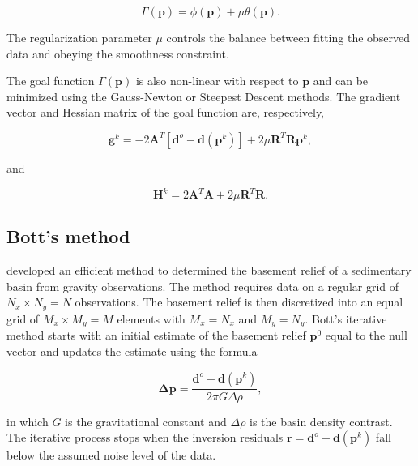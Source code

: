 \documentclass[extra,mreferee]{gji}
\begin{document}
\begin{equation}
    \Gamma(\mathbf{p}) = \phi(\mathbf{p}) + \mu\theta(\mathbf{p}).
\end{equation}

\noindent
The regularization parameter $\mu$ controls the balance between fitting the
observed data and obeying the smoothness constraint.

The goal function $\Gamma(\mathbf{p})$ is also non-linear with respect to
$\mathbf{p}$ and can be minimized using the Gauss-Newton or Steepest Descent
methods.
The gradient vector and Hessian matrix of the goal function are, respectively,

\begin{equation}
    \mathbf{g}^k =
        -2\mathbf{A}^T[\mathbf{d}^o - \mathbf{d}(\mathbf{p}^k)] +
        2\mu\mathbf{R}^T\mathbf{R}\mathbf{p}^k,
    \label{eq:gradient-regul}
\end{equation}

\noindent and

\begin{equation}
    \mathbf{H}^k = 2\mathbf{A}^T\mathbf{A} + 2\mu\mathbf{R}^T\mathbf{R}.
    \label{eq:hessian-regul}
\end{equation}



\subsection{Bott's method}

\citet{bott_use_1960} developed an efficient method to determined the basement
relief of a sedimentary basin from gravity observations.
The method requires data on a regular grid of $N_x \times N_y = N$
observations.
The basement relief is then discretized into an equal grid of $M_x \times
M_y = M$ elements with $M_x = N_x$ and $M_y = N_y$.
Bott's iterative method starts with an initial estimate of the basement relief
$\mathbf{p}^0$ equal to the null vector and updates the estimate using the formula

\begin{equation}
    \mathbf{\Delta p} = \dfrac{\mathbf{d}^o - \mathbf{d}(\mathbf{p}^k)}{2\pi G \Delta \rho},
    \label{eq:bott}
\end{equation}

\noindent
in which $G$ is the gravitational constant and $\Delta \rho$ is the basin
density contrast.
The iterative process stops when the inversion residuals
$\mathbf{r} = \mathbf{d}^o - \mathbf{d}(\mathbf{p}^k)$ fall below the assumed noise level
of the data.
\end{document}
